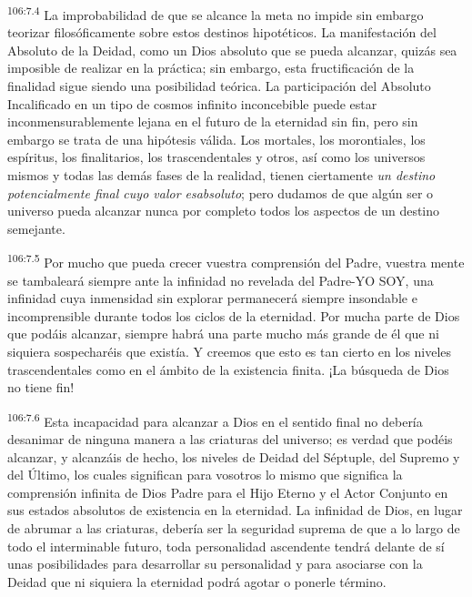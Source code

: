 \documentclass[twoside, 11pt]{book}
\begin{document}
\par
\textsuperscript{106:7.4} La improbabilidad de que se alcance la meta no impide sin embargo teorizar filosóficamente sobre estos destinos hipotéticos. La manifestación del Absoluto de la Deidad, como un Dios absoluto que se pueda alcanzar, quizás sea imposible de realizar en la práctica; sin embargo, esta fructificación de la finalidad sigue siendo una posibilidad teórica. La participación del Absoluto Incalificado en un tipo de cosmos infinito inconcebible puede estar inconmensurablemente lejana en el futuro de la eternidad sin fin, pero sin embargo se trata de una hipótesis válida. Los mortales, los morontiales, los espíritus, los finalitarios, los trascendentales y otros, así como los universos mismos y todas las demás fases de la realidad, tienen ciertamente \textit{un destino potencialmente final cuyo valor esabsoluto}; pero dudamos de que algún ser o universo pueda alcanzar nunca por completo todos los aspectos de un destino semejante.

\par
\textsuperscript{106:7.5} Por mucho que pueda crecer vuestra comprensión del Padre, vuestra mente se tambaleará siempre ante la infinidad no revelada del Padre-YO SOY, una infinidad cuya inmensidad sin explorar permanecerá siempre insondable e incomprensible durante todos los ciclos de la eternidad. Por mucha parte de Dios que podáis alcanzar, siempre habrá una parte mucho más grande de él que ni siquiera sospecharéis que existía. Y creemos que esto es tan cierto en los niveles trascendentales como en el ámbito de la existencia finita. ¡La búsqueda de Dios no tiene fin!

\par
\textsuperscript{106:7.6} Esta incapacidad para alcanzar a Dios en el sentido final no debería desanimar de ninguna manera a las criaturas del universo; es verdad que podéis alcanzar, y alcanzáis de hecho, los niveles de Deidad del Séptuple, del Supremo y del Último, los cuales significan para vosotros lo mismo que significa la comprensión infinita de Dios Padre para el Hijo Eterno y el Actor Conjunto en sus estados absolutos de existencia en la eternidad. La infinidad de Dios, en lugar de abrumar a las criaturas, debería ser la seguridad suprema de que a lo largo de todo el interminable futuro, toda personalidad ascendente tendrá delante de sí unas posibilidades para desarrollar su personalidad y para asociarse con la Deidad que ni siquiera la eternidad podrá agotar o ponerle término.
\end{document}

